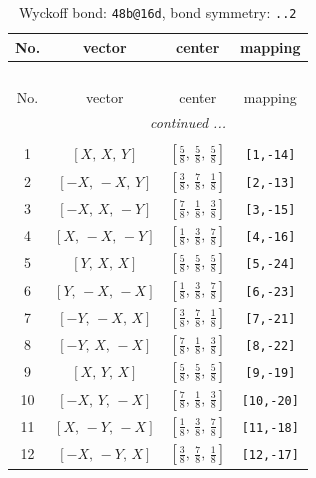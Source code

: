 \documentclass[fleqn,8pt]{jsarticle}
\begin{document}
\renewcommand{\arraystretch}{1.2}
\begin{longtable}{cccc}
\caption{Wyckoff bond: {\tt 48b@16d}, bond symmetry: {\tt ..2}}
 \\
 \hline \hline
No. & vector & center & mapping \\ \hline \endfirsthead

\multicolumn{3}{l}{\tablename\ \thetable{}} \\
 \hline \hline
No. & vector & center & mapping \\ \hline \endhead

 \hline \hline
\multicolumn{3}{r}{\footnotesize\it continued ...} \\ \endfoot

 \hline \hline
\multicolumn{3}{r}{} \\ \endlastfoot

1 & $\left[ X,\, X,\, Y \right]$ & $\left[ \frac{5}{8},\, \frac{5}{8},\, \frac{5}{8} \right]$ & {\tt [1,-14]} \\ \hline
2 & $\left[ - X,\, - X,\, Y \right]$ & $\left[ \frac{3}{8},\, \frac{7}{8},\, \frac{1}{8} \right]$ & {\tt [2,-13]} \\ \hline
3 & $\left[ - X,\, X,\, - Y \right]$ & $\left[ \frac{7}{8},\, \frac{1}{8},\, \frac{3}{8} \right]$ & {\tt [3,-15]} \\ \hline
4 & $\left[ X,\, - X,\, - Y \right]$ & $\left[ \frac{1}{8},\, \frac{3}{8},\, \frac{7}{8} \right]$ & {\tt [4,-16]} \\ \hline
5 & $\left[ Y,\, X,\, X \right]$ & $\left[ \frac{5}{8},\, \frac{5}{8},\, \frac{5}{8} \right]$ & {\tt [5,-24]} \\ \hline
6 & $\left[ Y,\, - X,\, - X \right]$ & $\left[ \frac{1}{8},\, \frac{3}{8},\, \frac{7}{8} \right]$ & {\tt [6,-23]} \\ \hline
7 & $\left[ - Y,\, - X,\, X \right]$ & $\left[ \frac{3}{8},\, \frac{7}{8},\, \frac{1}{8} \right]$ & {\tt [7,-21]} \\ \hline
8 & $\left[ - Y,\, X,\, - X \right]$ & $\left[ \frac{7}{8},\, \frac{1}{8},\, \frac{3}{8} \right]$ & {\tt [8,-22]} \\ \hline
9 & $\left[ X,\, Y,\, X \right]$ & $\left[ \frac{5}{8},\, \frac{5}{8},\, \frac{5}{8} \right]$ & {\tt [9,-19]} \\ \hline
10 & $\left[ - X,\, Y,\, - X \right]$ & $\left[ \frac{7}{8},\, \frac{1}{8},\, \frac{3}{8} \right]$ & {\tt [10,-20]} \\ \hline
11 & $\left[ X,\, - Y,\, - X \right]$ & $\left[ \frac{1}{8},\, \frac{3}{8},\, \frac{7}{8} \right]$ & {\tt [11,-18]} \\ \hline
12 & $\left[ - X,\, - Y,\, X \right]$ & $\left[ \frac{3}{8},\, \frac{7}{8},\, \frac{1}{8} \right]$ & {\tt [12,-17]} \\
\end{longtable}
\end{document}
